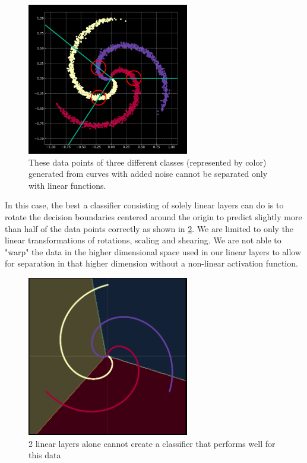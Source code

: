 \begin{figure}[ht]
    \centering
    \includegraphics[width=200pt]{figs/spiral2.png}
    \caption{These data points of three different classes (represented by color) generated from curves with added noise cannot be separated only with linear functions.}
    \label{fig:spiral_with_noise}
\end{figure}

In this case, the best a classifier consisting of solely linear layers can do is to rotate the decision boundaries centered around the origin to predict slightly more than half of the data points correctly as shown in \cref{fig:spiral_linear_classifier}.
We are limited to only the linear transformations of rotations, scaling and shearing.
We are not able to "warp" the data in the higher dimensional space used in our linear layers to allow for separation in that higher dimension without a non-linear activation function.

\begin{figure}[ht]
    \centering
    \includegraphics[width=200pt]{figs/linear.png}
    \caption{2 linear layers alone cannot create a classifier that performs well for this data}
    \label{fig:spiral_linear_classifier}
\end{figure}

